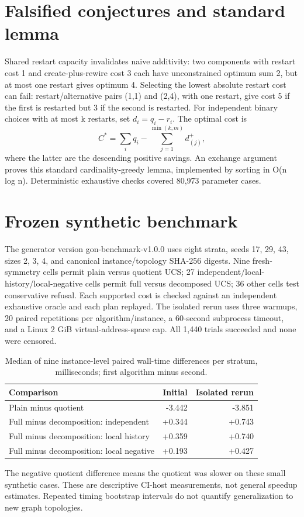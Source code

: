 \documentclass[10pt,a4paper]{article}
\begin{document}
\section{Falsified conjectures and standard lemma}
Shared restart capacity invalidates naive additivity: two components with restart cost 1 and create-plus-rewire cost 3 each have unconstrained optimum sum 2, but at most one restart gives optimum 4. Selecting the lowest absolute restart cost can fail: restart/alternative pairs (1,1) and (2,4), with one restart, give cost 5 if the first is restarted but 3 if the second is restarted. For independent binary choices with at most k restarts, set $d_i=q_i-r_i$. The optimal cost is
\[C^*=\sum_iq_i-\sum_{j=1}^{\min(k,m)}d^+_{(j)},\]
where the latter are the descending positive savings. An exchange argument proves this standard cardinality-greedy lemma, implemented by sorting in O(n log n). Deterministic exhaustive checks covered 80,973 parameter cases.
\section{Frozen synthetic benchmark}
The generator version gon-benchmark-v1.0.0 uses eight strata, seeds 17, 29, 43, sizes 2, 3, 4, and canonical instance/topology SHA-256 digests. Nine fresh-symmetry cells permit plain versus quotient UCS; 27 independent/local-history/local-negative cells permit full versus decomposed UCS; 36 other cells test conservative refusal. Each supported cost is checked against an independent exhaustive oracle and each plan replayed. The isolated rerun uses three warmups, 20 paired repetitions per algorithm/instance, a 60-second subprocess timeout, and a Linux 2 GiB virtual-address-space cap. All 1,440 trials succeeded and none were censored.
\begin{table}[ht]\centering\caption{Median of nine instance-level paired wall-time differences per stratum, milliseconds; first algorithm minus second.}\begin{tabular}{lrr}\toprule Comparison & Initial & Isolated rerun\\\midrule Plain minus quotient & -3.442 & -3.851\\ Full minus decomposition: independent & +0.344 & +0.743\\ Full minus decomposition: local history & +0.359 & +0.740\\ Full minus decomposition: local negative & +0.193 & +0.427\\\bottomrule\end{tabular}\end{table}
The negative quotient difference means the quotient was slower on these small synthetic cases. These are descriptive CI-host measurements, not general speedup estimates. Repeated timing bootstrap intervals do not quantify generalization to new graph topologies.
\end{document}
